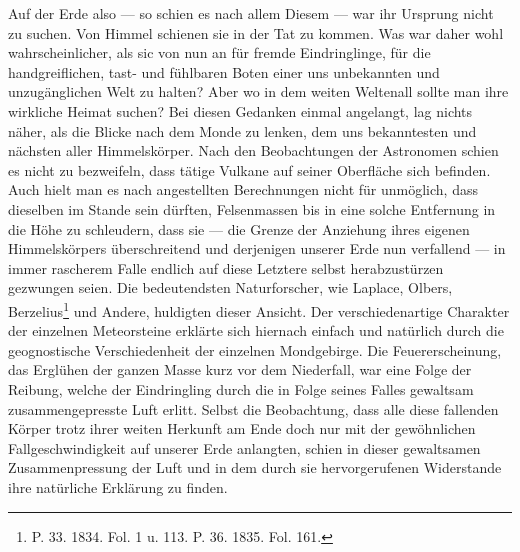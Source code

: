 \documentclass[a4paper, 8pt, oneside, polutonikogreek, german]{article}
\begin{document}
Auf der Erde also — so schien es nach allem Diesem — war ihr Ursprung nicht zu suchen. Von Himmel schienen sie in der Tat zu kommen. Was war daher wohl wahrscheinlicher, als sic von nun an für fremde Eindringlinge, für die handgreiflichen, tast- und fühlbaren Boten einer uns unbekannten und unzugänglichen Welt zu halten? Aber wo in dem weiten Weltenall sollte man ihre wirkliche Heimat suchen? Bei diesen Gedanken einmal angelangt, lag nichts näher, als die Blicke nach dem Monde zu lenken, dem uns bekanntesten und nächsten aller Himmelskörper. Nach den Beobachtungen der Astronomen schien es nicht zu bezweifeln, dass tätige Vulkane auf seiner Oberfläche sich befinden. Auch hielt man es nach angestellten Berechnungen nicht für unmöglich, dass dieselben im Stande sein dürften, Felsenmassen bis in eine solche Entfernung in die Höhe zu schleudern, dass sie — die Grenze der Anziehung ihres eigenen Himmelskörpers überschreitend und derjenigen unserer Erde nun verfallend — in immer rascherem Falle endlich auf diese Letztere selbst herabzustürzen gezwungen seien. Die bedeutendsten Naturforscher, wie Laplace, Olbers, Berzelius\footnote{P. 33. 1834. Fol. 1 u. 113. P. 36. 1835. Fol. 161.} und Andere, huldigten dieser Ansicht. Der verschiedenartige Charakter der einzelnen Meteorsteine erklärte sich hiernach einfach und natürlich durch die geognostische Verschiedenheit der einzelnen Mondgebirge. Die Feuererscheinung, das Erglühen der ganzen Masse kurz vor dem Niederfall, war eine Folge der Reibung, welche der Eindringling durch die in Folge seines Falles gewaltsam zusammengepresste Luft erlitt. Selbst die Beobachtung, dass alle diese fallenden Körper trotz ihrer weiten Herkunft am Ende doch nur mit der gewöhnlichen Fallgeschwindigkeit auf unserer Erde anlangten, schien in dieser gewaltsamen Zusammenpressung der Luft und in dem durch sie hervorgerufenen Widerstande ihre natürliche Erklärung zu finden.
\end{document}
